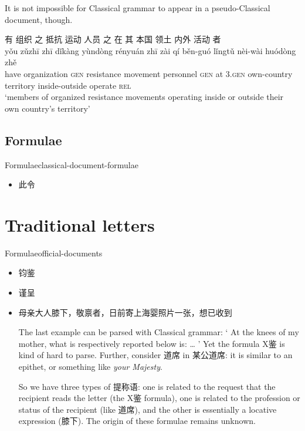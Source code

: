\documentclass[UTF8, a4paper, oneside, scheme=plain, 12pt]{ctexrep}
\newcommand{\form}[1]{\emph{#1}}
\newcommand{\translate}[1]{`#1'}
\newcommand*{\category}[1]{\textsc{#1}}
\begin{document}
It is not impossible for Classical grammar to appear in a pseudo-Classical document, though.

\begin{exe}
    \ex
    \glll 有 组织 之 抵抗 运动 人员 之 在 其 本国 领土 内外 活动 者 \\
    yǒu zǔzhī zhī dǐkàng yùndòng rényuán zhī zài qí běn-guó lǐngtǔ nèi-wài huódòng zhě \\
    have organization \category{gen} resistance movement personnel \category{gen} at 3.\category{gen} own-country territory inside-outside operate \category{rel} \\
    \glt\translate{members of organized resistance movements operating inside or outside their own country's territory}
\end{exe}

\subsection{Formulae}

\begin{todobox}{Formulae}{classical-document-formulae}
    \begin{itemize}
        \item 此令
    \end{itemize}
\end{todobox}

\section{Traditional letters}

\begin{todobox}{Formulae}{official-documents}
    \begin{itemize}
        \item 钧鉴
        \item 谨呈
        \item 母亲大人膝下，敬禀者，日前寄上海婴照片一张，想已收到
            
        The last example can be parsed with Classical grammar:
        \translate{
            At the knees of my mother, what is respectively reported below is: \dots
        }
        Yet the formula X鉴 is kind of hard to parse.
        Further, consider 道席 in 某公道席:
        it is similar to an epithet, or something like \form{your Majesty}.

        So we have three types of 提称语: one is related to the request that the recipient reads the letter (the X鉴 formula), one is related to the profession or status of the recipient (like 道席), and the other is essentially a locative expression (膝下).
        The origin of these formulae remains unknown.
    \end{itemize}
\end{todobox}
\end{document}
